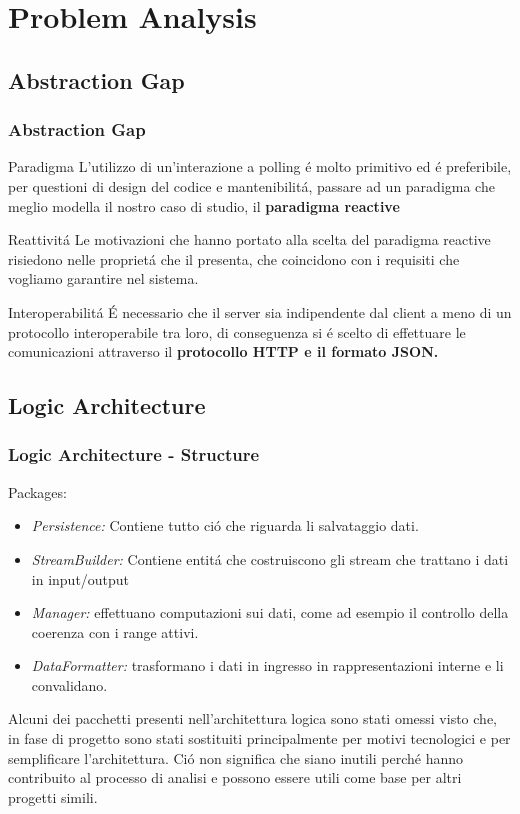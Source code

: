 \documentclass{beamer}
\begin{document}
\section{Problem Analysis}

\subsection{Abstraction Gap}

\begin{frame}
  \frametitle{Abstraction Gap}
  \begin{block}{Paradigma}
    L'utilizzo di un'interazione a polling \'e molto primitivo ed \'e preferibile, per questioni di design del codice e mantenibilit\'a, passare ad un paradigma che meglio modella il nostro caso di studio, il \textbf{paradigma reactive}
  \end{block}
  \begin{block}{Reattivit\'a}
    Le motivazioni che hanno portato alla scelta del paradigma reactive risiedono nelle propriet\'a che il \cite{reactiveManifesto} presenta, che coincidono con i requisiti che vogliamo garantire nel sistema.
  \end{block}
  \begin{block}{Interoperabilit\'a}
    \'E necessario che il server sia indipendente dal client a meno di un protocollo interoperabile tra loro, di conseguenza si \'e scelto di effettuare le comunicazioni attraverso il \textbf{protocollo HTTP e il formato JSON.}
  \end{block}
\end{frame}

\subsection{Logic Architecture}

\begin{frame}
  \frametitle{Logic Architecture - Structure}
  Packages:
  \begin{itemize}
    \item \textit{Persistence:} Contiene tutto ci\'o che riguarda li salvataggio dati.
    \item \textit{StreamBuilder:} Contiene entit\'a che costruiscono gli stream che trattano i dati in input/output
    \item \textit{Manager:} effettuano computazioni sui dati, come ad esempio il controllo della coerenza con i range attivi.
    \item \textit{DataFormatter:} trasformano i dati in ingresso in rappresentazioni interne e li convalidano.
  \end{itemize}
  Alcuni dei pacchetti presenti nell'architettura logica sono stati omessi visto che, in fase di progetto sono stati sostituiti principalmente per motivi tecnologici e per semplificare l'architettura. Ci\'o non significa che siano inutili perch\'e hanno contribuito al processo di analisi e possono essere utili come base per altri progetti simili.
\end{frame}
\end{document}
